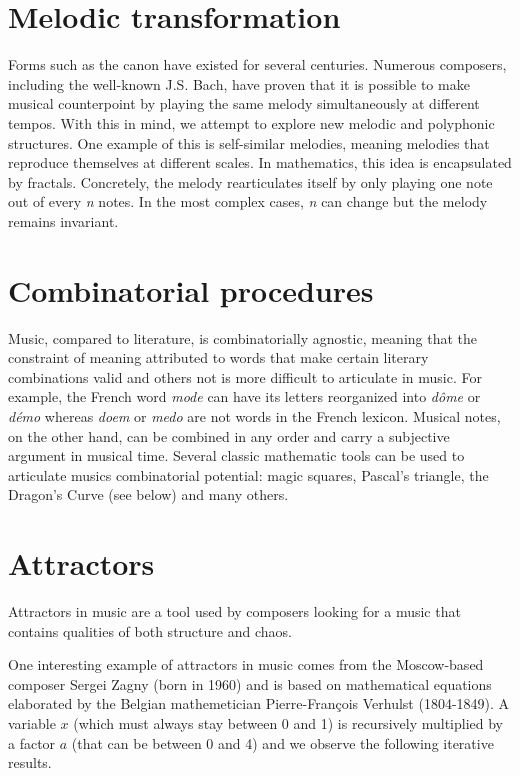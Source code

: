 \documentclass{article}
\begin{document}
\section*{Melodic transformation}
Forms such as the canon have existed for several centuries.  Numerous
composers, including the well-known J.S. Bach, have proven that it is
possible to make musical counterpoint by playing the same melody
simultaneously at different tempos.  With this in mind, we attempt to
explore new melodic and polyphonic structures.  One example of this is
self-similar melodies, meaning melodies that reproduce themselves at
different scales.  In mathematics, this idea is encapsulated by fractals. 
Concretely, the melody rearticulates itself by only playing one note out of
every \emph{n} notes.  In the most complex cases, \emph{n} can change but
the melody remains invariant.
\section*{Combinatorial procedures}
Music, compared to literature, is combinatorially agnostic, meaning that
the constraint of meaning attributed to words that make certain literary
combinations valid and others not is more difficult to articulate in music. 
For example, the French word \emph{mode} can have its letters reorganized
into \emph{d\^{o}me} or \emph{d\'{e}mo} whereas \emph{doem} or \emph{medo}
are not words in the French lexicon.  Musical notes, on the other hand, can
be combined in any order and carry a subjective argument in musical time.
Several classic mathematic tools can be used to articulate musics
combinatorial potential: magic squares, Pascal's triangle, the Dragon's
Curve (see below) and many others.
\section*{Attractors}
Attractors in music are a tool used by composers looking for a music that
contains qualities of both structure and chaos.

One interesting example of attractors in music comes from the Moscow-based
composer Sergei Zagny (born in 1960) and is based on mathematical equations
elaborated by the Belgian mathemetician Pierre-Fran\c{c}ois Verhulst
(1804-1849). A variable $x$ (which must always stay between 0 and 1) is
recursively multiplied by a factor $a$ (that can be between 0 and 4) and we
observe the following iterative results.
\end{document}
